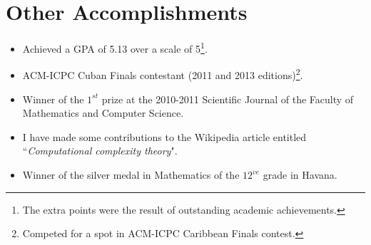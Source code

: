 \documentclass[]{friggeri-cv}
\begin{document}
\section{Other Accomplishments}
\begin{itemize}[noitemsep, nolistsep]

	\item Achieved a GPA of 5.13 over a scale of 5\footnote{The extra points were the result of outstanding academic achievements.}.\\

	\item ACM-ICPC Cuban Finals contestant (2011 and 2013 editions)\footnote{Competed for a spot in ACM-ICPC Caribbean Finals contest.}.\\

	\item Winner of the $1^{st}$ prize at the 2010-2011 Scientific Journal of the Faculty of Mathematics and Computer Science.\\
	
	\item I have made some contributions to the Wikipedia article entitled ``\emph{Computational complexity theory}".\\
		
	\item Winner of the silver medal in Mathematics of the $12^{ve}$ grade in Havana.\\
	
	
	
	
\end{itemize}
\end{document}
